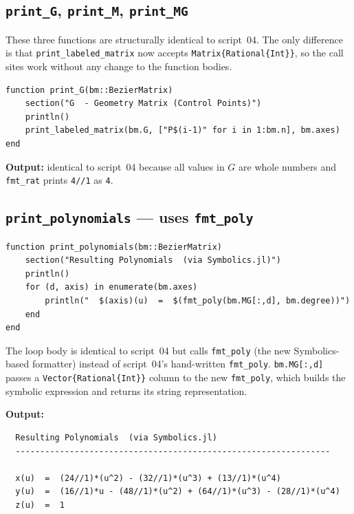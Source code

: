\documentclass[12pt, a4paper]{article}
\newcommand{\cd}[1]{\texttt{#1}}
\begin{document}
\subsection{\texttt{print\_G}, \texttt{print\_M}, \texttt{print\_MG}}

These three functions are structurally identical to
script~04.
The only difference is that \cd{print\_labeled\_matrix}
now accepts \cd{Matrix\{Rational\{Int\}\}}, so the call
sites work without any change to the function bodies.

\begin{verbatim}
function print_G(bm::BezierMatrix)
    section("G  - Geometry Matrix (Control Points)")
    println()
    print_labeled_matrix(bm.G, ["P$(i-1)" for i in 1:bm.n], bm.axes)
end
\end{verbatim}

\textbf{Output:} identical to script~04 because all
values in $G$ are whole numbers and \cd{fmt\_rat} prints
\cd{4//1} as \cd{4}.

\subsection{\texttt{print\_polynomials} --- uses \texttt{fmt\_poly}}

\begin{verbatim}
function print_polynomials(bm::BezierMatrix)
    section("Resulting Polynomials  (via Symbolics.jl)")
    println()
    for (d, axis) in enumerate(bm.axes)
        println("  $(axis)(u)  =  $(fmt_poly(bm.MG[:,d], bm.degree))")
    end
end
\end{verbatim}

The loop body is identical to script~04 but calls
\cd{fmt\_poly} (the new Symbolics-based formatter) instead
of script~04's hand-written \cd{fmt\_poly}.
\cd{bm.MG[:,d]} passes a \cd{Vector\{Rational\{Int\}\}}
column to the new \cd{fmt\_poly}, which builds the symbolic
expression and returns its string representation.

\textbf{Output:}
\begin{verbatim}
  Resulting Polynomials  (via Symbolics.jl)
  ----------------------------------------------------------------

  x(u)  =  (24//1)*(u^2) - (32//1)*(u^3) + (13//1)*(u^4)
  y(u)  =  (16//1)*u - (48//1)*(u^2) + (64//1)*(u^3) - (28//1)*(u^4)
  z(u)  =  1
\end{verbatim}

\end{document}
